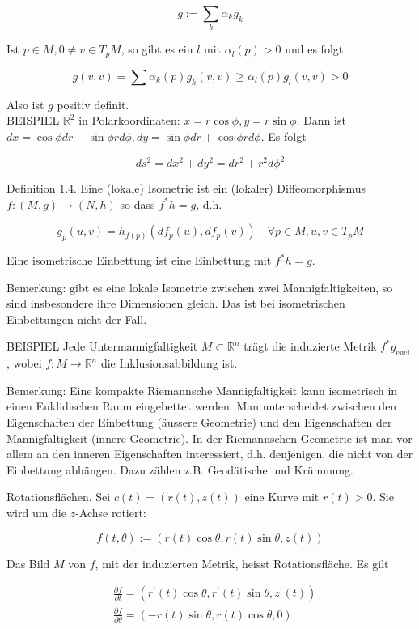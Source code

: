 \documentclass[10pt]{article}
\begin{document}
$$
g:=\sum_{k} \alpha_{k} g_{k}
$$

Ist $p \in M, 0 \neq v \in T_{p} M$, so gibt es ein $l$ mit $\alpha_{l}(p)>0$ und es folgt

$$
g(v, v)=\sum \alpha_{k}(p) g_{k}(v, v) \geq \alpha_{l}(p) g_{l}(v, v)>0
$$

Also ist $g$ positiv definit.\\
BEISPIEL $\mathbb{R}^{2}$ in Polarkoordinaten: $x=r \cos \phi, y=r \sin \phi$. Dann ist $d x=\cos \phi d r-\sin \phi r d \phi, d y=\sin \phi d r+\cos \phi r d \phi$. Es folgt

$$
d s^{2}=d x^{2}+d y^{2}=d r^{2}+r^{2} d \phi^{2}
$$

Definition 1.4. Eine (lokale) Isometrie ist ein (lokaler) Diffeomorphismus $f:(M, g) \rightarrow(N, h)$ so dass $f^{*} h=g$, d.h.

$$
g_{p}(u, v)=h_{f(p)}\left(d f_{p}(u), d f_{p}(v)\right) \quad \forall p \in M, u, v \in T_{p} M
$$

Eine isometrische Einbettung ist eine Einbettung mit $f^{*} h=g$.

Bemerkung: gibt es eine lokale Isometrie zwischen zwei Mannigfaltigkeiten, so sind insbesondere ihre Dimensionen gleich. Das ist bei isometrischen Einbettungen nicht der Fall.

BEISPIEL Jede Untermannigfaltigkeit $M \subset \mathbb{R}^{n}$ trägt die induzierte Metrik $f^{*} g_{\text {eucl }}$, wobei $f: M \rightarrow \mathbb{R}^{n}$ die Inklusionsabbildung ist.

Bemerkung: Eine kompakte Riemannsche Mannigfaltigkeit kann isometrisch in einen Euklidischen Raum eingebettet werden. Man unterscheidet zwischen den Eigenschaften der Einbettung (äussere Geometrie) und den Eigenschaften der Mannigfaltigkeit (innere Geometrie). In der Riemannschen Geometrie ist man vor allem an den inneren Eigenschaften interessiert, d.h. denjenigen, die nicht von der Einbettung abhängen. Dazu zählen z.B. Geodätische und Krümmung.

Rotationsflächen. Sei $c(t)=(r(t), z(t))$ eine Kurve mit $r(t)>0$. Sie wird um die $z$-Achse rotiert:

$$
f(t, \theta):=(r(t) \cos \theta, r(t) \sin \theta, z(t))
$$

Das Bild $M$ von $f$, mit der induzierten Metrik, heisst Rotationsfläche. Es gilt

$$
\begin{aligned}
& \frac{\partial f}{\partial t}=\left(r^{\prime}(t) \cos \theta, r^{\prime}(t) \sin \theta, z^{\prime}(t)\right) \\
& \frac{\partial f}{\partial \theta}=(-r(t) \sin \theta, r(t) \cos \theta, 0)
\end{aligned}
$$
\end{document}
